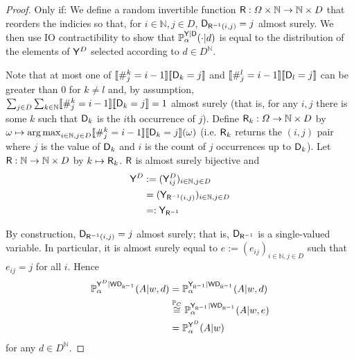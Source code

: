 \begin{proof}
Only if:
We define a random invertible function $\mathsf{R}:\Omega\times \mathbb{N}\to \mathbb{N}\times {D}$ that reorders the indicies so that, for $i\in \mathbb{N},j\in D$, $\mathsf{D}_{\mathsf{R}^{-1}(i,j)}=j$ almost surely. We then use IO contractibility to show that $\mathbb{P}_\alpha^{\mathsf{Y}|\mathsf{D}}(\cdot|d)$ is equal to the distribution of the elements of $\mathsf{Y}^D$ selected according to $d\in D^{\mathbb{N}}$.

Note that at most one of $\llbracket \#_j^k = i-1\rrbracket\llbracket \mathsf{D}_k=j\rrbracket$ and $\llbracket \#_j^l = i-1\rrbracket\llbracket \mathsf{D}_l=j\rrbracket$ can be greater than 0 for $k\neq l$ and, by assumption, $\sum_{j\in D}\sum_{k\in \mathbb{N}} \llbracket \#_j^k = i-1\rrbracket\llbracket \mathsf{D}_k=j\rrbracket=1$ almost surely (that is, for any $i,j$ there is some $k$ such that $\mathsf{D}_k$ is the $i$th occurrence of $j$). Define $\mathsf{R}_k:\Omega\to \mathbb{N}\times D$ by $\omega \mapsto \operatorname*{arg\,max}_{i\in\mathbb{N},j\in D} \llbracket \#_j^k = i-1\rrbracket\llbracket \mathsf{D}_k=j\rrbracket(\omega)$ (i.e. $\mathsf{R}_k$ returns the $(i,j)$ pair where $j$ is the value of $\mathsf{D}_k$ and $i$ is the count of $j$ occurrences up to $\mathsf{D}_k$). Let $\mathsf{R}:\mathbb{N}\to \mathbb{N}\times D$ by $k\mapsto \mathsf{R}_k$. $\mathsf{R}$ is almost surely bijective and 
\begin{align}
    \mathsf{Y}^D&:= (\mathsf{Y}^D_{ij})_{i\in \mathbb{N},j\in D}\\
    &= (\mathsf{Y}_{\mathsf{R}^{-1}(i,j)})_{i\in \mathbb{N},j\in D}\\
    &=: \mathsf{Y}_{\mathsf{R}^{-1}}
\end{align}

By construction, $\mathsf{D}_{\mathsf{R}^{-1}(i,j)}=j$ almost surely; that is, $\mathsf{D}_{\mathsf{R}^{-1}}$ is a single-valued variable. In particular, it is almost surely equal to $e:=(e_{ij})_{i\in\mathbb{N},j\in D}$ such that $e_{ij}=j$ for all $i$. Hence
\begin{align}
    \mathbb{P}_\alpha^{\mathsf{Y}^D|\mathsf{W}\mathsf{D}_{\mathsf{R}^{-1}}}(A|w,d)&= \mathbb{P}_\alpha^{\mathsf{Y}_{\mathsf{R}^{-1}}|\mathsf{W}\mathsf{D}_{\mathsf{R}^{-1}}}(A|w,d)\\
    &\overset{\mathbb{P}_C}{\cong} \mathbb{P}_\alpha^{\mathsf{Y}_{\mathsf{R}^{-1}}|\mathsf{W}\mathsf{D}_{\mathsf{R}^{-1}}}(A|w,e)\label{eqApp:yd_is_indep}\\
    &= \mathbb{P}_\alpha^{\mathsf{Y}^D}(A|w)\label{eqApp:yd_dist}
\end{align}
for any $d\in D^{\mathbb{N}}$.


\end{proof}
